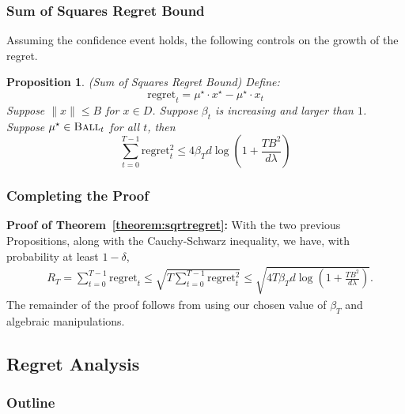 \documentclass[aspectratio=169]{beamer}
\newtheorem{proposition}[theorem]{Proposition}
\begin{document}
  \begin{frame}\frametitle{Sum of Squares Regret Bound}

Assuming the confidence event holds,
the following controls on the growth of the regret.  

\begin{proposition}\label{proposition:l2regretbd}
(Sum of Squares Regret Bound) Define:
\[
\mathrm{regret}_t = \mu^\star \cdot x^\star - \mu^\star \cdot x_t 
\]
Suppose $\|x\|\leq B$ for $x\in
D$. Suppose $\beta_t$ is increasing and larger than $1$.
Suppose $\mu^\star \in \textsc{Ball}_t$ for all $t$, then 
\[
\sum_{t=0}^{T-1} \mathrm{regret}_t^2  \le %
4\beta_T d\log\left( 1 + \frac{TB^2}{ d \lambda } \right)
\]
\end{proposition}

\end{frame}

\begin{frame}\frametitle{Completing the Proof}
 
\textbf{Proof of Theorem~\ref{theorem:sqrtregret}:}
With the two previous Propositions,  along with
the Cauchy-Schwarz 
inequality, we have, with probability at least $1-\delta$,
\begin{align*}
&R_T = \sum_{t=0}^{T-1} \mathrm{regret}_t
\le \sqrt{ T \sum_{t=0}^{T-1} \mathrm{regret}_t^2 }
\le \sqrt{4T\beta_T d\log\left( 1 + \frac{TB^2}{ d \lambda } \right)}.
\end{align*}
The remainder of the proof follows from using our chosen value of
$\beta_T$ and algebraic manipulations.


\end{frame}

\subsection{Regret Analysis}
 \begin{frame}[noframenumbering]
    \frametitle{Outline}
    \tableofcontents[currentsubsection]
  \end{frame}
\end{document}
